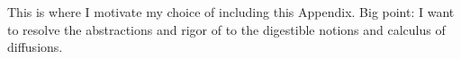 This is where I motivate my choice of including this Appendix.
Big point: I want to resolve the abstractions and rigor of \cite{jacod2003} to the digestible notions and calculus of diffusions.
